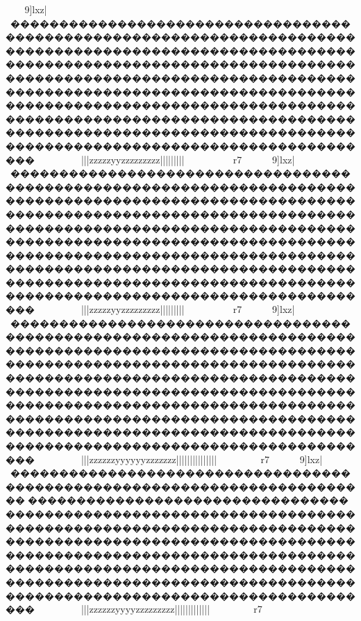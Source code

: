 {{{{{{{{{{{{{{{{{{{{{{{{{{{{{{{{{{{{{{{{{{{{{{{{{{{{{{{{{{{{{{{{{{{{{{{{{{{{{{{{{{{{{{{{{{{{{{{{{{{{{{{{{{{{{{{{{{{{{{{{{{{{{{{{{{{{{{{{{{{{{{{{{{{{{{{{{{{{{{{{{{{{{{{{{{{{{{{{{{{{{{{{{{{{{{{{{{{{{{{{{{{{{{{{{{{{{{{{{{{{{{{{{{{{{{{{{{{{{{{{{{{{{{{{{{{{{{{{{{{{{{{{{{{{{{{{{{{{{{{{{{{{{{{{{{{{{{{{{{{{{{{{{{{{{{{{{{{{{{{{{{{{{{{{{{{{{{{{{{{{{{{{{{{{{{{{{{{{{{{{{{{{{{{{{{{{{{{{{{{{{{{{{{{{{{{{{{{{{{{{{{{{{{{{{{{{{{{{{{{{{{{{{{{{{{{{{{{{{{{{{{{{{{{{{{{{{{{{{{{{{{{{{{{{{{{{{{{{{{{{{{{{{{{{{{{{{{{{{{{{{{{{{{{{{{{{{{{{{{{{{{{{{{{{{{{{{{{{{{{{{{{{{{{{{{{{{{{{{{{{{{{{{{{{{{{{{{{{9]lxz|}}}~��������������������������������������������������������������������������������������������������������������������������������������������������������������������������������������������������������������������������������������������������������������������������������������������������������������������������������������������������������������������������~~~~~~~~~}}{{{{{{|||{{{{z{{{{zzzzyyzzzzzzzzz{{{{|||||}}}}}}}}}}}}}}}}}}}}||||}}}~~~~~r7
9]lxz|}}}~��������������������������������������������������������������������������������������������������������������������������������������������������������������������������������������������������������������������������������������������������������������������������������������������������������������������������������������������������������������������������~~~~~~~~~}}{{{{{{|||{{{{z{{{{zzzzyyzzzzzzzzz{{{{|||||}}}}}}}}}}}}}}}}}}}}||||}}}~~~~~r7
9]lxz|}}}~��������������������������������������������������������������������������������������������������������������������������������������������������������������������������������������������������������������������������������������������������������������������������������������������������������������������������������������������������������������������������~~~~~~~~~}}{{{{{{|||{{{zzzzzz{{yyyyyyzzzzzzz{{{{|||||||||}}}}}}}}||||}}}}}}}}||}}~~~~r7
9]lxz|}}}~�������������������������������������������������������������������������������������������������������������������������������������������������������������������������������������������������������������������������������������������������������������������������������������������������������������������������������������������������������������������������~~~~~~~~~}}{{{{{{|||{{{zzzzzz{{yyyyzzzzzzzzz{{{{|||||||||}}}}}}}}||||}}}}}}}}}}}}~~~~r7
}}}}}}}}}}}}}}}}}}}}}}}}}}}}}}}}}}}}}}}}}}}}}}}}}}}}}}}}}}}}}}}}}}}}}}}}}}}}}}}}}}}}}}}}}}}}}}}}}}}}}}}}}}}}}}}}}}}}}}}}}}}}}}}}}}}}}}}}}}}}}}}}}}}}}}}}}}}}}}}}}}}}}}}}}}}}}}}}}}}}}}}}}}}}}}}}}}}}}}}}}}}}}}}}}}}}}}}}}}}}}}}}}}}}}}}}}}}}}}}}}}}}}}}}}}}}}}}}}}}}}}}}}}}}}}}}}}}}}}}}}}}}}}}}}}}}}}}}}}}}}}}}}}}}}}}}}}}}}}}}}}}}}}}}}}}}}}}}}}}}}}}}}}}}}}}}}}}}}}}}}}}}}}}}}}}}}}}}}}}}}}}}}}}}}}}}}}}}}}}}}}}}}}}}}}}}}}}}}}}}}}}}}}}}}}}}}}}}}}}}}}}}}}}}}}}}}}}}}}}}}}}}}}}}}}}}}}}}}}}}}}}}}}}}}}}}}}}}}}}}}}}}}}}}}}}}}}}}}}}}}}}}}}}}}}}}}}}}}}

